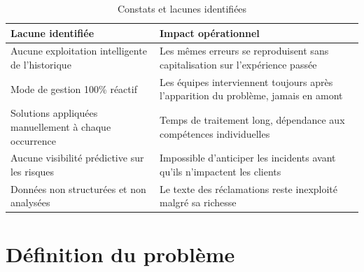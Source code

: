 \documentclass[12pt,a4paper]{report}
\begin{document}
\begin{table}[H]
\centering
\caption{Constats et lacunes identifiées}
\begin{tabularx}{\textwidth}{|X|X|}
\hline
\textbf{Lacune identifiée} & \textbf{Impact opérationnel} \\
\hline
Aucune exploitation intelligente de l'historique & Les mêmes erreurs se reproduisent sans capitalisation sur l'expérience passée \\
\hline
Mode de gestion 100\% réactif & Les équipes interviennent toujours après l'apparition du problème, jamais en amont \\
\hline
Solutions appliquées manuellement à chaque occurrence & Temps de traitement long, dépendance aux compétences individuelles \\
\hline
Aucune visibilité prédictive sur les risques & Impossible d'anticiper les incidents avant qu'ils n'impactent les clients \\
\hline
Données non structurées et non analysées & Le texte des réclamations reste inexploité malgré sa richesse \\
\hline
\end{tabularx}
\end{table}

\section{Définition du problème}

\vspace{0.5cm}
\noindent{}
\vspace{0.5cm}
\end{document}
